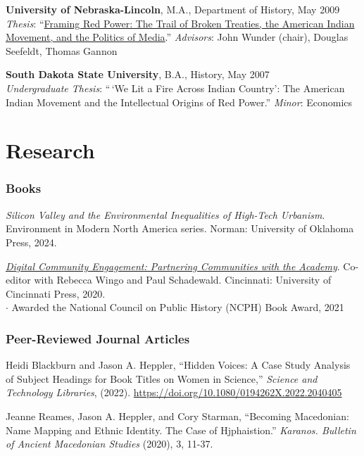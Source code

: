 \textbf{University of Nebraska-Lincoln}, M.A., Department of History,
May 2009\\
\emph{Thesis}:
``\href{http://digitalcommons.unl.edu/historydiss/21/}{Framing Red
Power: The Trail of Broken Treaties, the American Indian Movement, and
the Politics of Media}.'' \emph{Advisors}: John Wunder (chair), Douglas
Seefeldt, Thomas Gannon

\textbf{South Dakota State University}, B.A., History, May 2007\\
\emph{Undergraduate Thesis}: ``\,`We Lit a Fire Across Indian Country':
The American Indian Movement and the Intellectual Origins of Red
Power.'' \emph{Minor}: Economics

\section{Research}\label{research}

\subsubsection{Books}\label{books}

\emph{Silicon Valley and the Environmental Inequalities of High-Tech
Urbanism}. Environment in Modern North America series. Norman:
University of Oklahoma Press, 2024.

\emph{\href{https://ucincinnatipress.manifoldapp.org/projects/digital-community-engagement}{Digital
Community Engagement: Partnering Communities with the Academy}}.
Co-editor with Rebecca Wingo and Paul Schadewald. Cincinnati: University
of Cincinnati Press, 2020.\\
\quad \(\cdot\) Awarded the National Council on Public History (NCPH)
Book Award, 2021

\subsubsection{Peer-Reviewed Journal
Articles}\label{peer-reviewed-journal-articles}

Heidi Blackburn and Jason A. Heppler, ``Hidden Voices: A Case Study
Analysis of Subject Headings for Book Titles on Women in Science,''
\emph{Science and Technology Libraries}, (2022).
\url{https://doi.org/10.1080/0194262X.2022.2040405}

Jeanne Reames, Jason A. Heppler, and Cory Starman, ``Becoming
Macedonian: Name Mapping and Ethnic Identity. The Case of Hjphaistion.''
\emph{Karanos. Bulletin of Ancient Macedonian Studies} (2020), 3, 11-37.

